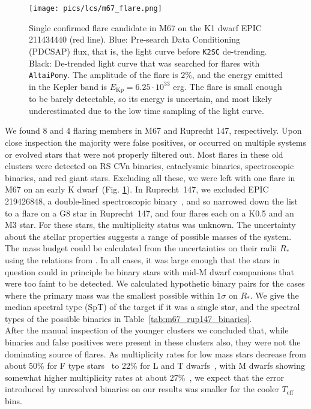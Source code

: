 \documentclass{aa}
\begin{document}
\begin{figure}[ht!]
    \centering
    \texttt{[image: pics/lcs/m67\_flare.png]}
    \caption{Single confirmed flare candidate in M67 on the K1 dwarf EPIC 211434440 (red line). Blue: Pre-search Data Conditioning (PDCSAP) flux, that is, the light curve before \texttt{K2SC} de-trending. Black: De-trended light curve that was searched for flares with \texttt{AltaiPony}. The amplitude of the flare is $2\%$, and the energy emitted in the Kepler band is $E_\mathrm{Kp}=6.25\cdot10^{33}$ erg. The flare is small enough to be barely detectable, so its energy is uncertain, and most likely underestimated due to the low time sampling of the light curve.}      
    \label{fig:m67}
\end{figure}
We found 8 and 4 flaring members in M67 and Ruprecht 147, respectively. Upon close inspection the majority were false positives, or occurred on multiple systems or evolved stars that were not properly filtered out. Most flares in these old clusters were detected on RS CVn binaries, cataclysmic binaries, spectroscopic binaries, and red giant stars. Excluding all these, we were left with one flare in M67 on an early K dwarf~(Fig. \ref{fig:m67}). In Ruprecht~147, we excluded EPIC 219426848, a double-lined spectroscopic binary~\citep{curtis2013}, and so narrowed down the list to a flare on a G8 star in Ruprecht~147, and four flares each on a K0.5 and an M3 star. For these stars, the multiplicity status was unknown. The uncertainty about the stellar properties suggests a range of possible masses of the system. The mass budget could be calculated from the uncertainties on their radii $R_*$ using the relations from \citet{eker2018}. In all cases, it was large enough that the stars in question could in principle be binary stars with mid-M dwarf companions that were too faint to be detected. We calculated hypothetic binary pairs for the cases where the primary mass was the smallest possible within $1\sigma$ on $R_*$. We give the median spectral type (SpT) of the target if it was a single star, and the spectral types of the possible binaries in Table~\ref{tab:m67_rup147_binaries}.
\\
After the manual inspection of the younger clusters we concluded that, while binaries and false positives were present in these clusters also, they were not the dominating source of flares. As multiplicity rates for low mass stars decrease from about 50\% for F type stars~\citep{raghavan2010} to 22\% for L and T dwarfs~\citep{duchene2013}, with M dwarfs showing somewhat higher multiplicity rates at about 27\%~\citep{winters2019}, we expect that the error introduced by unresolved binaries on our results was smaller for the cooler $T_\mathrm{eff}$ bins.
\end{document}
